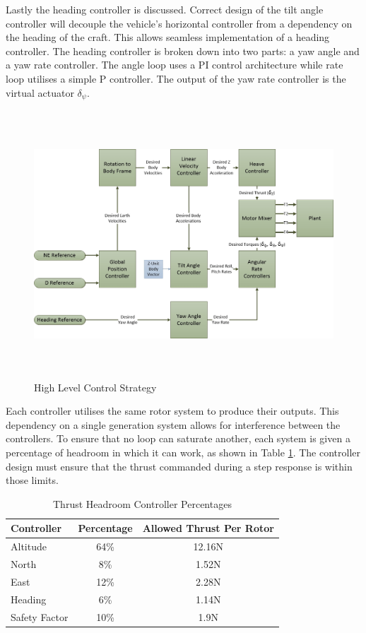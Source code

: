 \documentclass[12pt]{report}
\begin{document}
Lastly the heading controller is discussed. Correct design of the tilt angle controller will decouple the vehicle's horizontal controller from a dependency on the heading of the craft. This allows seamless implementation of a heading controller. The heading controller is broken down into two parts: a yaw angle and a yaw rate controller. The angle loop uses a PI control architecture while rate loop utilises a simple P controller. The output of the yaw rate controller is the virtual actuator $\delta_\psi$.

\begin{figure}[H]
	\centering
	\includegraphics[height = 10cm]{../References/Diagrams/HighLevel.jpg}
	\caption{High Level Control Strategy}
	\label{IM_ControlStrategy}
\end{figure}

Each controller utilises the same rotor system to produce their outputs. This dependency on a single generation system allows for interference between the controllers. To ensure that no loop can saturate another, each system is given a percentage of headroom in which it can work, as shown in Table \ref{tab:HeadRoomPercentages}. The controller design must ensure that the thrust commanded during a step response is within those limits.

\begin{table}[H]
	\centering
	\begin{tabular}{l | c | c |}
		Controller 				& Percentage & Allowed Thrust Per Rotor\\
		\hline\hline
		Altitude 	   			& 64\% & 12.16N	\\
		North  		    		& 8\%  & 1.52N	\\
		East					& 12\% & 2.28N	\\
		Heading 		    	& 6\%  & 1.14N	\\
		Safety Factor 			& 10\% & 1.9N   \\
	\end{tabular}
	\caption{Thrust Headroom Controller Percentages}
	\label{tab:HeadRoomPercentages}
\end{table}
\end{document}
